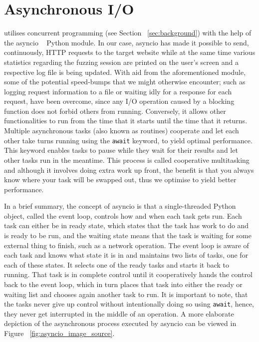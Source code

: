 \section{Asynchronous I/O}
\pname{} utilises concurrent programming (see Section ~\ref{sec:background}) with the help of the asyncio ~\cite{asyncio} Python module. In our case, asyncio has made it possible to send, continuously, HTTP requests to the target website while at the same time various statistics regarding the fuzzing session are printed on the user's screen and a respective log file is being updated. With aid from the aforementioned module, some of the potential speed-bumps that we might otherwise encounter; such as logging request information to a file or waiting idly for a response for each request, 
have been overcome, since any I/O operation caused by a blocking function does not forbid others from running. Conversely, it allows other functionalities to run from the time that it starts until the time that it returns. Multiple asynchronous tasks (also known as routines) cooperate and let each other take turns running using the {\tt await} keyword, to yield optimal performance. This keyword enables tasks to pause while they wait for their results and let other tasks run in the meantime. This process is called cooperative multitasking and although it involves doing extra work up front, the benefit is that you always know where your task will be swapped out, thus we optimise to yield better performance.

In a brief summary, the concept of asyncio is that a single-threaded Python object, called the event loop, controls how and when each task gets run. Each task can either be in ready state, which states that the task has work to do and is ready to be run, and the waiting state means that the task is waiting for some external thing to finish, such as a network operation. The event loop is aware of each task and knows what state it is in and maintains two lists of tasks, one for each of these states. It selects one of the ready tasks and starts it back to running. That task is in complete control until it cooperatively hands the control back to the event loop, which in turn places that task into either the ready or waiting list and chooses again another task to run. It is important to note, that the tasks never give up control without intentionally doing so using {\tt await}, hence, they never get interrupted in the middle of an operation. A more elaborate depiction of the asynchronous process executed by asyncio can be viewed in Figure ~\ref{fig:asyncio_image_source}.


